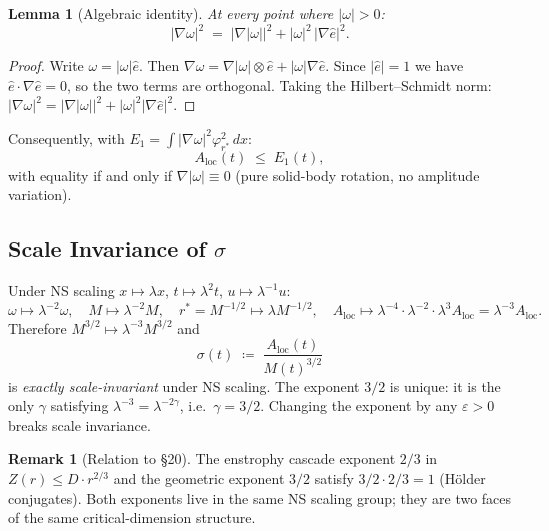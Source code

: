 \documentclass[11pt]{article}
\newtheorem{lemma}[theorem]{Lemma}
\theoremstyle{definition}
\newtheorem{remark}[theorem]{Remark}
\theoremstyle{remark}
\providecommand{\colonequals}{\coloneqq}
\begin{document}
\begin{lemma}[Algebraic identity]\label{lem:grad-omega-split}
  At every point where $|\omega|>0$:
  \begin{equation}\label{eq:grad-omega-split}
    |\nabla\omega|^2 \;=\; |\nabla|\omega||^2 + |\omega|^2\,|\nabla\hat{e}|^2.
  \end{equation}
\end{lemma}
\begin{proof}
  Write $\omega = |\omega|\hat{e}$.  Then $\nabla\omega = \nabla|\omega|\otimes\hat{e}
  + |\omega|\nabla\hat{e}$.  Since $|\hat{e}|=1$ we have $\hat{e}\cdot\nabla\hat{e}=0$,
  so the two terms are orthogonal.  Taking the Hilbert--Schmidt norm:
  $|\nabla\omega|^2 = |\nabla|\omega||^2 + |\omega|^2|\nabla\hat{e}|^2$.
\end{proof}

Consequently, with $E_1 = \int|\nabla\omega|^2\varphi_{r^*}^2\,dx$:
\begin{equation}\label{eq:A-leq-E1}
  A_{\mathrm{loc}}(t) \;\leq\; E_1(t),
\end{equation}
with equality if and only if $\nabla|\omega|\equiv 0$ (pure solid-body rotation,
no amplitude variation).

\subsection{Scale Invariance of \texorpdfstring{$\sigma$}{sigma}}

Under NS scaling $x\mapsto\lambda x$, $t\mapsto\lambda^2 t$, $u\mapsto\lambda^{-1}u$:
\[
  \omega\mapsto\lambda^{-2}\omega,\quad
  M\mapsto\lambda^{-2}M,\quad
  r^* = M^{-1/2}\mapsto\lambda M^{-1/2},\quad
  A_{\mathrm{loc}}\mapsto\lambda^{-4}\cdot\lambda^{-2}\cdot\lambda^3 A_{\mathrm{loc}}
       = \lambda^{-3}A_{\mathrm{loc}}.
\]
Therefore $M^{3/2}\mapsto\lambda^{-3}M^{3/2}$ and
\begin{equation}\label{eq:sigma-def}
  \sigma(t) \;\colonequals\; \frac{A_{\mathrm{loc}}(t)}{M(t)^{3/2}}
\end{equation}
is \emph{exactly scale-invariant} under NS scaling.  The exponent $3/2$ is unique:
it is the only $\gamma$ satisfying $\lambda^{-3}=\lambda^{-2\gamma}$, i.e.\ $\gamma=3/2$.
Changing the exponent by any $\varepsilon>0$ breaks scale invariance.

\begin{remark}[Relation to §20]
  The enstrophy cascade exponent $2/3$ in $Z(r)\leq D\cdot r^{2/3}$ and the
  geometric exponent $3/2$ satisfy $3/2 \cdot 2/3 = 1$ (Hölder conjugates).
  Both exponents live in the same NS scaling group; they are two faces of the
  same critical-dimension structure.
\end{remark}
\end{document}
